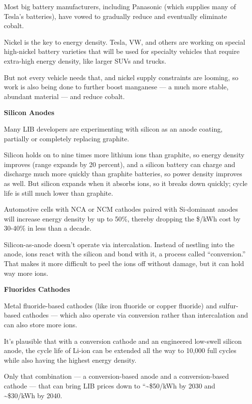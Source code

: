 \documentclass[
]{book}
\begin{document}
Most big battery manufacturers, including Panasonic (which supplies many of Tesla's batteries), have vowed to gradually reduce and eventually eliminate cobalt.

Nickel is the key to energy density. Tesla, VW, and others are working on special high-nickel battery varieties that will be used for specialty vehicles that require extra-high energy density, like larger SUVs and trucks.

But not every vehicle needs that, and nickel supply constraints are looming, so work is also being done to further boost manganese --- a much more stable, abundant material --- and reduce cobalt.

\textbf{Silicon Anodes}

Many LIB developers are experimenting with silicon as an anode coating, partially or completely replacing graphite.

Silicon holds on to nine times more lithium ions than graphite, so energy density improves (range expands by 20 percent), and a silicon battery can charge and discharge much more quickly than graphite batteries, so power density improves as well. But silicon expands when it absorbs ions, so it breaks down quickly; cycle life is still much lower than graphite.

Automotive cells with NCA or NCM cathodes paired with Si-dominant anodes will increase energy density by up to 50\%, thereby dropping the \$/kWh cost by 30-40\% in less than a decade.

Silicon-as-anode doesn't operate via intercalation. Instead of nestling into the anode, ions react with the silicon and bond with it, a process called ``conversion.'' That makes it more difficult to peel the ions off without damage, but it can hold way more ions.

\textbf{Fluorides Cathodes}

Metal fluoride-based cathodes (like iron fluoride or copper fluoride) and sulfur-based cathodes --- which also operate via conversion rather than intercalation and can also store more ions.

It's plausible that with a conversion cathode and an engineered low-swell silicon anode, the cycle life of Li-ion can be extended all the way to 10,000 full cycles while also having the highest energy density.

Only that combination --- a conversion-based anode and a conversion-based cathode --- that can bring LIB prices down to ``\textasciitilde\$50/kWh by 2030 and \textasciitilde\$30/kWh by 2040.
\end{document}
